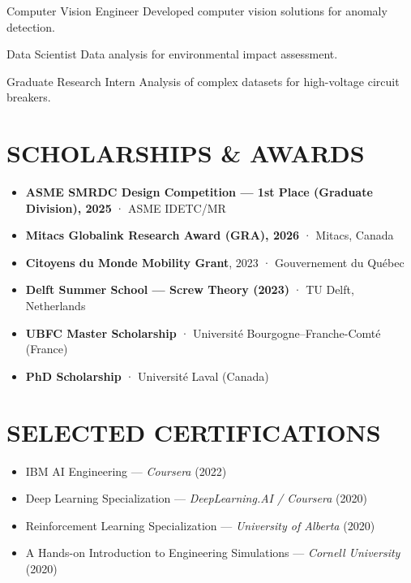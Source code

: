 \documentclass[11pt,oneside,a4paper]{article} %
\begin{document}
{\begin{minipage}{11.3cm}
{Computer Vision Engineer}
{Developed computer vision solutions for anomaly detection.}

\vspace*{0.22cm}

{Data Scientist}
{Data analysis for environmental impact assessment.}

\vspace*{0.22cm}

{Graduate Research Intern}
{Analysis of complex datasets for high-voltage circuit breakers.}

\section*{{\faTrophy}\;SCHOLARSHIPS \& AWARDS}
\begin{itemize}[leftmargin=*, itemsep=0.2ex, topsep=0.4ex]
\footnotesize
\item \textbf{ASME SMRDC Design Competition --- 1st Place (Graduate Division), 2025} · ASME IDETC/MR
\item \textbf{Mitacs Globalink Research Award (GRA), 2026} · Mitacs, Canada
\item \textbf{Citoyens du Monde Mobility Grant}, 2023 · Gouvernement du Qu\'ebec
\item \textbf{Delft Summer School --- Screw Theory (2023)} · TU Delft, Netherlands
\item \textbf{UBFC Master Scholarship} · Universit\'e Bourgogne--Franche-Comt\'e (France)
\item \textbf{PhD Scholarship} · Universit\'e Laval (Canada)
\end{itemize}

\section*{{\faCertificate} SELECTED CERTIFICATIONS}
\begin{itemize}[leftmargin=*, itemsep=0.2ex]
\footnotesize
\item IBM AI Engineering --- \textit{Coursera} (2022)
\item Deep Learning Specialization --- \textit{DeepLearning.AI / Coursera} (2020)
\item Reinforcement Learning Specialization --- \textit{University of Alberta} (2020)
\item A Hands-on Introduction to Engineering Simulations --- \textit{Cornell University} (2020)
\end{itemize}

\end{minipage}}%
\end{document}
